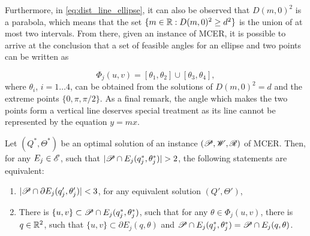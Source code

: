 Furthermore, in \autoref{eq:dist_line_ellipse}, it can also be observed that $D(m, 0)^2$ is a parabola, which means that the set $\{m\in\mathbb{R}: D(m, 0)^2 \ge d^2\}$ is the union of at most two intervals. From there, given an instance of MCER, it is possible to arrive at the conclusion that a set of feasible angles for an ellipse and two points can be written as

\begin{equation}\label{eq:phi_j}
\Phi_j(u,v) = [\theta_1, \theta_2] \cup [\theta_3, \theta_4], 
\end{equation}
where $\theta_i$, $i=1\dots 4$, can be obtained from the solutions of $D(m, 0)^2=d$ and the extreme points $\{0, \pi, \pi/2\}$.
As a final remark, the angle which makes the two points form a vertical line deserves special treatment as its line cannot be represented by the equation $y=mx$.

\begin{lema}\label{lema:3pnts}
Let $(Q^*, \Theta^*)$ be an optimal solution of an instance $(\mathscr{P}, \mathscr{W}, \mathscr{R})$ of MCER. Then, for any $E_j \in \mathscr{E}$, such that $|\Pp \cap E_j(q_j^*, \theta_j^*)|>2$, the following statements are equivalent:
	
	\begin{enumerate}[label=(\alph*)]
		\item $|\mathscr{P}\cap \partial E_j(q'_j, \theta'_j)| < 3$, for any equivalent solution $(Q', \Theta')$, \label{lema:3pnts_a}
		
		\item There is $\{u, v\}\subset\mathscr{P} \cap E_j(q_j^*, \theta_j^*)$, such that for any $\theta\in\Phi_j(u,v)$, there is $q\in\mathbb{R}^2$, such that $\{u, v\} \subset \partial E_j(q, \theta)$ and $\mathscr{P} \cap E_j(q^*_j, \theta^*_j) = \mathscr{P} \cap E_j(q, \theta)$.\label{lema:3pnts_b}
	\end{enumerate}
\end{lema}

